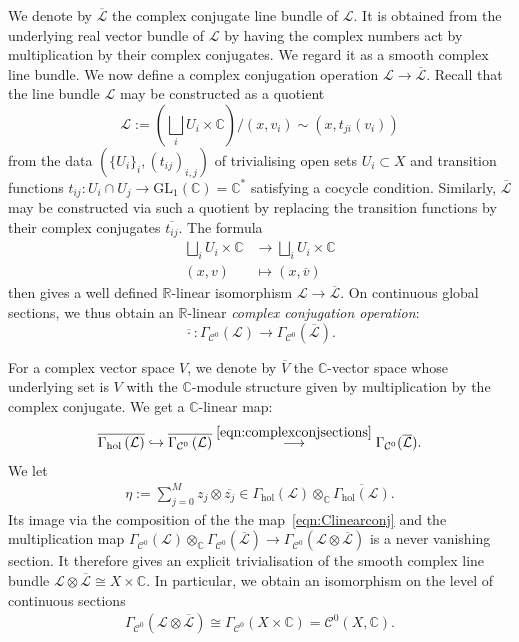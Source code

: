 \documentclass[a4paper]{amsart}
\newcommand{\bR}{\mathbb R}
\newcommand{\bC}{\mathbb C}
\newcommand{\cC}{\mathcal C}
\newcommand{\cL}{\mathcal L}
\newcommand{\lra}{\longrightarrow}
\theoremstyle{plain}
\theoremstyle{definition}
\newcommand{\Gammahol}{\Gamma_{\mathrm{hol}}}
\begin{document}
We denote by $\overline{\cL}$ the complex conjugate line bundle of $\cL$. It is obtained from the underlying real vector bundle of $\cL$ by having the complex numbers act by multiplication by their complex conjugates. We regard it as a smooth complex line bundle. We now define a complex conjugation operation $\cL \to \overline{\cL}$. Recall that the line bundle $\cL$ may be constructed as a quotient
\[
    \cL := \left(\bigsqcup_i U_i \times \bC \right) \Big/ (x,v_i) \sim (x,t_{ji}(v_i))
\]
from the data $\left( \{U_i\}_i, (t_{ij})_{i,j} \right)$ of trivialising open sets $U_i \subset X$ and transition functions $t_{ij} \colon U_i \cap U_j \to \mathrm{GL}_1(\bC) = \bC^*$ satisfying a cocycle condition. Similarly, $\overline{\cL}$ may be constructed via such a quotient by replacing the transition functions by their complex conjugates $\overline{t_{ij}}$. The formula
\begin{equation*}
\begin{split}
    \bigsqcup_i U_i \times \bC &\lra \bigsqcup_i U_i \times \bC \\
    (x,v) &\longmapsto (x,\overline{v})
\end{split}
\end{equation*}
then gives a well defined $\bR$-linear isomorphism $\cL \to \overline{\cL}$. On continuous global sections, we thus obtain an $\bR$-linear \emph{complex conjugation operation}:
\begin{equation}\label{eqn:complexconjsections}
    \overline{\cdot} \colon \Gamma_{\cC^0}(\cL) \lra \Gamma_{\cC^0}(\overline{\cL}).
\end{equation}


For a complex vector space $V$, we denote by $\overline{V}$ the $\bC$-vector space whose underlying set is $V$ with the $\bC$-module structure given by multiplication by the complex conjugate. We get a $\bC$-linear map:
\begin{align}\label{eqn:Clinearconj}
    \overline{\Gammahol\left(\cL \right)} \hookrightarrow \overline{\Gamma_{\cC^0}\left(\cL \right)} \overset{\eqref{eqn:complexconjsections}}{\lra} \Gamma_{\cC^0}(\overline{\cL}).
\end{align}
We let
\begin{align}\label{eqn:defeta}
    \eta := \sum_{j=0}^M z_j \otimes \overline{z_j} \in \Gammahol\left( \cL \right) \otimes_\bC \overline{\Gammahol\left( \cL \right)}.
\end{align}
Its image via the composition of the the map~\eqref{eqn:Clinearconj} and the multiplication map $\Gamma_{\cC^0}(\cL) \otimes_\bC \Gamma_{\cC^0}(\overline{\cL}) \to \Gamma_{\cC^0}(\cL \otimes \overline{\cL})$ is a never vanishing section. It therefore gives an explicit trivialisation of the smooth complex line bundle $\cL \otimes \overline{\cL} \cong X \times \bC$. In particular, we obtain an isomorphism on the level of continuous sections
\begin{align}\label{eqn:trivialisationsections}
    \Gamma_{\cC^0}(\cL \otimes \overline{\cL}) \cong \Gamma_{\cC^0}(X \times \bC) = \cC^0(X, \bC).
\end{align}
\end{document}
